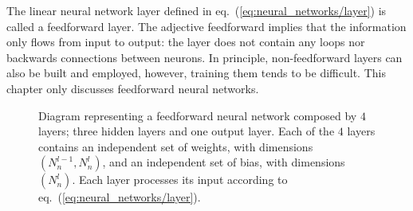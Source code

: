 The linear neural network layer defined in eq.~(\ref{eq:neural_networks/layer}) is called a feedforward layer.
The adjective feedforward implies that the information only flows from input to output: the layer does not
contain any loops nor backwards connections between neurons. In principle, non-feedforward layers can also be
built and employed, however, training them tends to be difficult. This chapter only discusses feedforward
neural networks.

\begin{figure}[H]
	\centering
	\caption{
        Diagram representing a feedforward neural network composed by $4$ layers; three hidden
        layers and one output layer. Each of the $4$ layers contains an independent set of weights,
        with dimensions $(N_{n}^{l-1}, N_{n}^{l})$, and an independent set of bias, with dimensions
        $(N_{n}^{l})$. Each layer processes its input according to
        eq.~(\ref{eq:neural_networks/layer}).
    }\label{fig:neural_networks/neural_network}
\end{figure}
